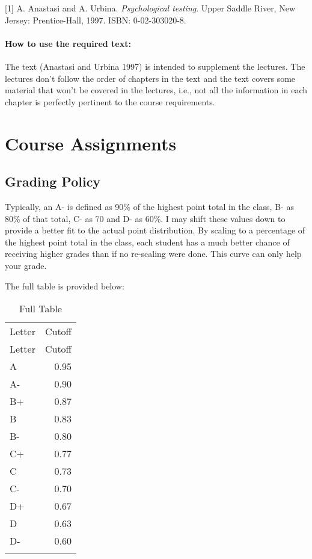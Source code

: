 \documentclass[11pt,]{article}
\begin{document}
{[}1{]} A. Anastasi and A. Urbina. \emph{Psychological testing}. Upper
Saddle River, New Jersey: Prentice-Hall, 1997. ISBN: 0-02-303020-8.

\hypertarget{how-to-use-the-required-text}{%
\paragraph{How to use the required
text:}\label{how-to-use-the-required-text}}

The text (Anastasi and Urbina 1997) is intended to supplement the
lectures. The lectures don't follow the order of chapters in the text
and the text covers some material that won't be covered in the lectures,
i.e., not all the information in each chapter is perfectly pertinent to
the course requirements.

\hypertarget{course-assignments}{%
\section{Course Assignments}\label{course-assignments}}

\hypertarget{grading-policy}{%
\subsection{Grading Policy}\label{grading-policy}}

Typically, an A- is defined as 90\% of the highest point total in the
class, B- as 80\% of that total, C- as 70 and D- as 60\%. I may shift
these values down to provide a better fit to the actual point
distribution. By scaling to a percentage of the highest point total in
the class, each student has a much better chance of receiving higher
grades than if no re-scaling were done. This curve can only help your
grade.

The full table is provided below:

\begin{longtable}[]{@{}lr@{}}
\caption{Full Table}\tabularnewline
\toprule
Letter & Cutoff \\ \addlinespace
\midrule
\endfirsthead
\toprule
Letter & Cutoff \\ \addlinespace
\midrule
\endhead
A & 0.95 \\ \addlinespace
A- & 0.90 \\ \addlinespace
B+ & 0.87 \\ \addlinespace
B & 0.83 \\ \addlinespace
B- & 0.80 \\ \addlinespace
C+ & 0.77 \\ \addlinespace
C & 0.73 \\ \addlinespace
C- & 0.70 \\ \addlinespace
D+ & 0.67 \\ \addlinespace
D & 0.63 \\ \addlinespace
D- & 0.60 \\ \addlinespace
\bottomrule
\end{longtable}
\end{document}
